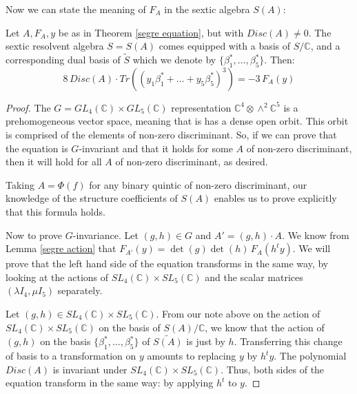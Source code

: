 \documentclass{article}
\begin{document}
Now we can state the meaning of $F_A$ in the sextic algebra $S(A)$:

\begin{theorem} \label{trace cubed}
Let $A, F_A, y$ be as in Theorem \ref{segre equation}, but with $Disc(A) \neq 0$.  The sextic resolvent algebra $S = S(A)$ comes equipped with a basis of $S / \mathbb{C}$, and a corresponding dual basis of $\tilde{S}$ which we denote by $\{ \beta_1^*, \ldots, \beta_5^* \}$.  Then:
\begin{equation}
8 \, Disc(A) \cdot Tr( (y_1 \beta_1^* + \ldots + y_5 \beta_5^*)^3 ) = - 3 \, F_A(y)
\end{equation}
\end{theorem}

\begin{proof}
The $G = GL_4(\mathbb{C}) \times GL_5(\mathbb{C})$ representation $\mathbb{C}^4 \otimes \wedge^2 \mathbb{C}^5$ is a prehomogeneous vector space, meaning that is has a dense open orbit.  This orbit is comprised of the elements of non-zero discriminant.  So, if we can prove that the equation is $G$-invariant and that it holds for some $A$ of non-zero discriminant, then it will hold for all $A$ of non-zero discriminant, as desired.

Taking $A = \Phi(f)$ for any binary quintic of non-zero discriminant, our knowledge of the structure coefficients of $S(A)$ enables us to prove explicitly that this formula holds.

Now to prove $G$-invariance.  Let $(g,h) \in G$ and $A' = (g,h) \cdot A$.  We know from Lemma \ref{segre action} that $F_{A'}(y) = \det(g) \det(h) \, F_A(h^t y)$.  We will prove that the left hand side of the equation transforms in the same way, by looking at the actions of $SL_4(\mathbb{C}) \times SL_5(\mathbb{C})$ and the scalar matrices $(\lambda I_4,\mu I_5)$ separately.

Let $(g,h) \in SL_4(\mathbb{C}) \times SL_5(\mathbb{C})$.  From our note above on the action of $SL_4(\mathbb{C}) \times SL_5(\mathbb{C})$ on the basis of $S(A)/\mathbb{C}$, we know that the action of $(g,h)$ on the basis $\{\beta_1^*,\ldots,\beta_5^*\}$ of $\tilde{S(A)}$ is just by $h$.  Transferring this change of basis to a transformation on $y$ amounts to replacing $y$ by $h^t y$.  The polynomial $Disc(A)$ is invariant under $SL_4(\mathbb{C}) \times SL_5(\mathbb{C})$.  Thus, both sides of the equation transform in the same way: by applying $h^t$ to $y$.


\end{proof}
\end{document}
